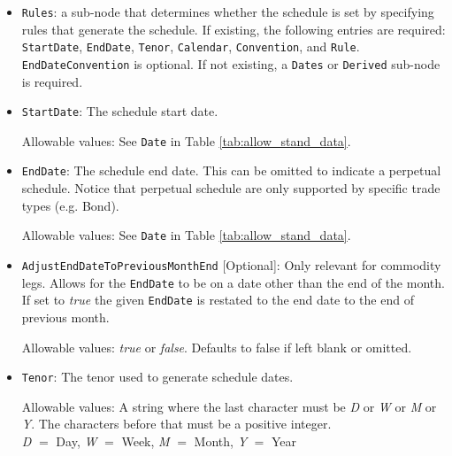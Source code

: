 \begin{itemize}
\item \lstinline!Rules!: a sub-node that determines whether the schedule is set by specifying rules that
generate the schedule. If existing, the following entries are required: \lstinline!StartDate!, \lstinline!EndDate!, \lstinline!Tenor!, \lstinline!Calendar!, 
\lstinline!Convention!, and \lstinline!Rule!. \lstinline!EndDateConvention! is optional. If not existing, a \lstinline!Dates! or \lstinline!Derived!
sub-node is required.
\item \lstinline!StartDate!:  The schedule start date.  

Allowable values:  See \lstinline!Date! in Table \ref{tab:allow_stand_data}.

\item \lstinline!EndDate!: The schedule end date. This can be omitted to indicate a perpetual schedule. Notice that perpetual
  schedule are only supported by specific trade types (e.g. Bond).

Allowable values:  See \lstinline!Date! in Table \ref{tab:allow_stand_data}.

\item \lstinline!AdjustEndDateToPreviousMonthEnd! [Optional]: Only relevant for commodity legs. Allows for the \lstinline!EndDate! to be on a date other than the end of the month. If set to \emph{true} the given \lstinline!EndDate! is restated to the end date to the end of previous month.

Allowable values: \emph{true} or \emph{false}. Defaults to false if left blank or omitted.

\item \lstinline!Tenor!: The tenor used to generate schedule dates. 

Allowable values: A string where the last character must be \emph{D} or \emph{W} or
\emph{M} or \emph{Y}.  The characters before that must be a positive integer. \\ \emph{D}
$=$ Day, \emph{W} $=$ Week, \emph{M} $=$ Month, \emph{Y} $=$ Year


\end{itemize}
